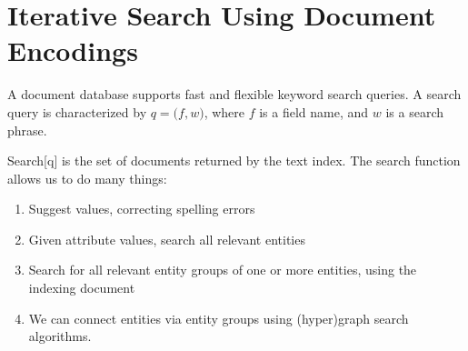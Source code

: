 	\section{Iterative Search Using Document Encodings}
		A document database supports fast and flexible keyword search queries.	A search query is characterized by $q = \bigl(f, w\bigr)$, where $f$ is a field name, and $w$ is a search phrase.
		
		Search[q] is the set of documents returned by the text index.  The search function allows us to do many things:
		
		\begin{enumerate}
			\item Suggest values, correcting spelling errors
			\item Given attribute values, search all relevant entities
			\item Search for all relevant entity groups of one or more entities, using the indexing document
			\item We can connect entities via entity groups using (hyper)graph search algorithms.
		\end{enumerate}